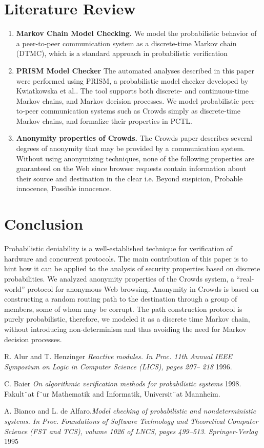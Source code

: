\documentclass{article}
\begin{document}
\section{Literature Review}

\begin{enumerate}
\item \textbf{{Markov Chain Model Checking.}}\newline
 We model the probabilistic behavior of a peer-to-peer communication system as a discrete-time Markov chain (DTMC), which is a standard approach in probabilistic verification
\item \textbf{{ PRISM Model Checker}}\newline
 The automated analyses described in this paper were performed using PRISM, a
probabilistic model checker developed by Kwiatkowska et al.. The tool supports both discrete- and continuous-time Markov chains, and Markov decision processes. We model probabilistic peer-to-peer communication systems such as Crowds simply as discrete-time Markov chains, and formalize their properties in PCTL.
\item\textbf{{ Anonymity properties of Crowds.}}\newline
 The Crowds paper describes several degrees of anonymity that may be provided by a communication system. Without using anonymizing techniques, none of the following properties are guaranteed on the Web since browser requests contain information about their source and destination in the clear i.e. Beyond suspicion, Probable innocence, Possible innocence.
\end{enumerate}
\section{Conclusion}
Probabilistic deniability is a well-established technique for verification of hardware and concurrent protocols. The main contribution of this paper is to hint how it can be applied to the analysis of security properties based on discrete probabilities. We analyzed anonymity properties of the Crowds system, a “real-world” protocol for anonymous Web browsing. Anonymity in Crowds is based on constructing a random routing path to the destination through a group of members, some of whom may be corrupt. The path construction protocol is purely probabilistic, therefore, we modeled it as a discrete time Markov chain, without introducing non-determinism and thus avoiding the need for Markov decision processes.
 \begin{thebibliography}{1}

 R. Alur and T. Henzinger {\em Reactive modules. In Proc. 11th Annual
IEEE Symposium on Logic in Computer Science (LICS), pages 207–
218} 1996.

  C. Baier {\em On algorithmic verification methods for probabilistic
systems} 1998. Fakult¨at f¨ur Mathematik and Informatik,
Universit¨at Mannheim.

\bibitem A. Bianco and L. de Alfaro.{\em Model checking of probabilistic and
nondeterministic systems. In Proc. Foundations of Software Technology
and Theoretical Computer Science (FST and TCS), volume 1026 of
LNCS, pages 499–513. Springer-Verlag} 1995
  \end{thebibliography}
\end{document}
